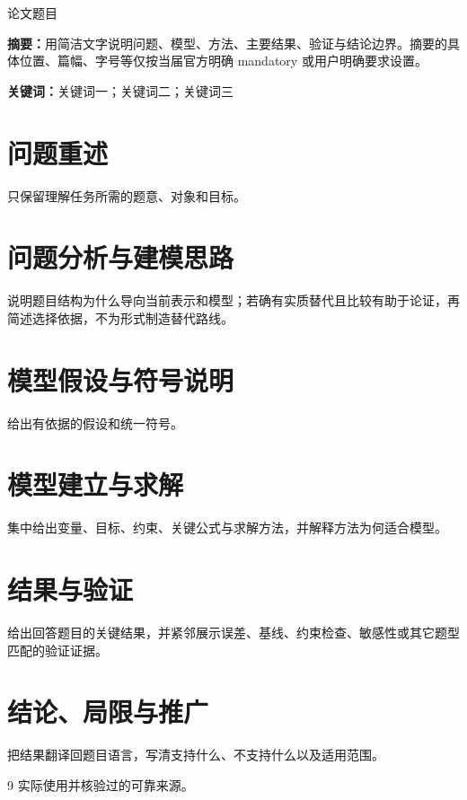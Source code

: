 \documentclass[UTF8]{ctexart}
\begin{document}
\begin{center}
  {\Large 论文题目}
\end{center}

\noindent\textbf{摘要：}用简洁文字说明问题、模型、方法、主要结果、验证与结论边界。摘要的具体位置、篇幅、字号等仅按当届官方明确 mandatory 或用户明确要求设置。

\noindent\textbf{关键词：}关键词一；关键词二；关键词三

\section{问题重述}
只保留理解任务所需的题意、对象和目标。

\section{问题分析与建模思路}
说明题目结构为什么导向当前表示和模型；若确有实质替代且比较有助于论证，再简述选择依据，不为形式制造替代路线。

\section{模型假设与符号说明}
给出有依据的假设和统一符号。

\section{模型建立与求解}
集中给出变量、目标、约束、关键公式与求解方法，并解释方法为何适合模型。

\section{结果与验证}
给出回答题目的关键结果，并紧邻展示误差、基线、约束检查、敏感性或其它题型匹配的验证证据。

\section{结论、局限与推广}
把结果翻译回题目语言，写清支持什么、不支持什么以及适用范围。

\begin{thebibliography}{9}
 实际使用并核验过的可靠来源。
\end{thebibliography}
\end{document}
